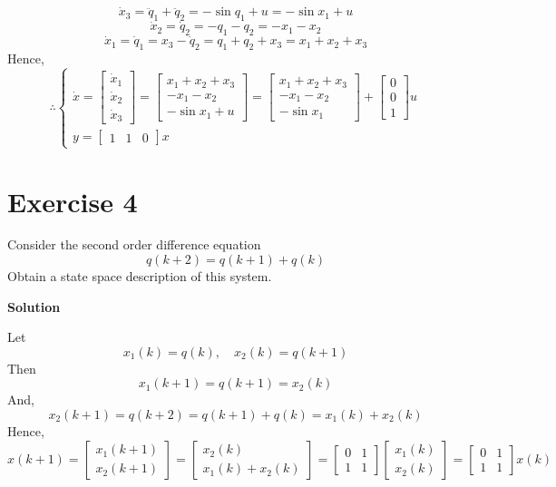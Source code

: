 \documentclass[12pt,a4paper]{article}
\begin{document}
\[
	\dot x_3 = \ddot q_1 + \ddot q_2 = -\sin q_1 + u = -\sin x_1 + u
\]
\[
	\dot x_2 = \dot q_2 = -q_1 -q_2 = - x_1 - x_2
\]
\[
	\dot x_1 = \dot q_1 = x_3 - \dot q_2 = q_1 + q_2 + x_3 = x_1 + x_2 + x_3
\]
Hence, 
\[
\therefore 
\begin{cases}
\dot x = \begin{bmatrix}
	\dot x_1 \\ \dot x_2 \\ \dot x_3
\end{bmatrix} = \begin{bmatrix}
	x_1 + x_2 + x_3 \\ -x_1 - x_2 \\ -\sin x_1 + u
\end{bmatrix} = \begin{bmatrix}
	x_1 + x_2 + x_3 \\ -x_1 - x_2 \\ -\sin x_1 
\end{bmatrix} + \begin{bmatrix}
0 \\ 0 \\ 1
\end{bmatrix} u \\
y = \begin{bmatrix}
	1 & 1 & 0
\end{bmatrix} x
\end{cases}
\]

\section*{Exercise 4}
Consider the second order difference equation
\[
q(k+2)=q(k+1)+q(k)
\]
Obtain a state space description of this system.

\textbf{Solution}

Let 
\[
	x_1(k) = q(k), \quad x_2(k) = q(k + 1)
\]
Then
\[
	x_1(k + 1) = q(k + 1) = x_2(k)
\]
And, 
\[
	x_2(k + 1) = q(k + 2) = q(k + 1) + q(k) = x_1(k) + x_2(k)
\]
Hence, 
\[
x(k + 1) = \begin{bmatrix}
	x_1(k + 1) \\ x_2 (k + 1)
\end{bmatrix} = \begin{bmatrix}
x_2(k) \\ x_1(k) + x_2(k) 
\end{bmatrix} = \begin{bmatrix}
0 & 1 \\ 1 & 1
\end{bmatrix}\begin{bmatrix}
x_1(k) \\ x_2(k)
\end{bmatrix} =  \begin{bmatrix}
0 & 1 \\ 1 & 1
\end{bmatrix} x(k)
\]
\end{document}
